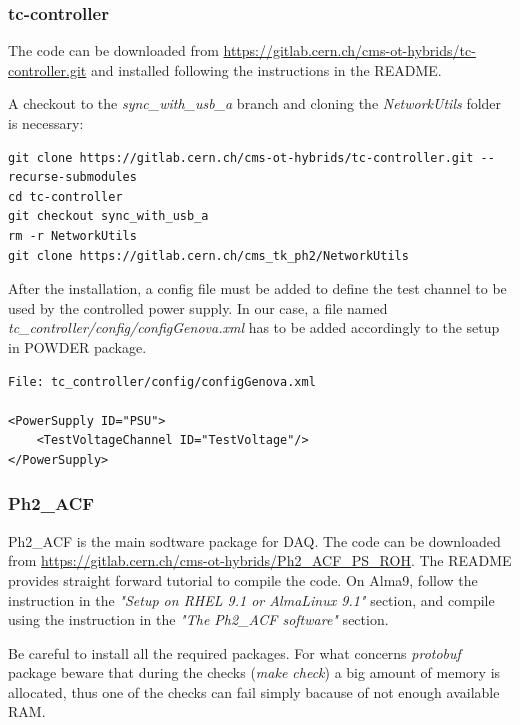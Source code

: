 \documentclass[10pt,a4paper]{article}
\begin{document}
\subsubsection{tc-controller}
\label{tc-controller}

The code can be downloaded from \url{https://gitlab.cern.ch/cms-ot-hybrids/tc-controller.git} and installed following the instructions in the README.

A checkout to the \emph{sync\_with\_usb\_a} branch and cloning the \emph{NetworkUtils} folder is necessary:

\begin{framed}
\begin{verbatim}
git clone https://gitlab.cern.ch/cms-ot-hybrids/tc-controller.git --recurse-submodules
cd tc-controller
git checkout sync_with_usb_a
rm -r NetworkUtils
git clone https://gitlab.cern.ch/cms_tk_ph2/NetworkUtils
\end{verbatim}
\end{framed}

After the installation, a config file must be added to define the test channel to be used by the controlled power supply.
In our case, a file named {\it tc\_controller/config/configGenova.xml} has to be added accordingly to the setup in POWDER package.

\begin{framed}
\begin{verbatim}
File: tc_controller/config/configGenova.xml

<PowerSupply ID="PSU">
    <TestVoltageChannel ID="TestVoltage"/>
</PowerSupply>
\end{verbatim}
\end{framed}

\subsubsection{Ph2\_ACF}
\label{ph2_acf}

Ph2\_ACF is the main sodtware package for DAQ.
The code can be downloaded from \url{https://gitlab.cern.ch/cms-ot-hybrids/Ph2_ACF_PS_ROH}. 
The README provides straight forward tutorial to compile the code. On Alma9, follow the instruction in the \emph{"Setup on RHEL 9.1 or AlmaLinux 9.1"} section, and compile using the instruction in the \emph{"The Ph2\_ACF software"} section.

Be careful to install all the required packages. For what concerns {\it protobuf} package beware that during the checks (\emph{make check}) a big amount of memory is allocated, thus one of the checks can fail simply bacause of not enough available RAM.  
\end{document}
